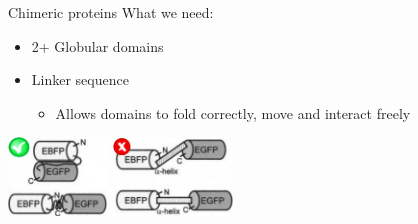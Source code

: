 \documentclass{beamer}
\begin{document}
\begin{frame}{Chimeric proteins}
What we need:
\begin{itemize}
 \item 2+ Globular domains
 \item Linker sequence
 \begin{itemize}
    \pause
    \item Allows domains to fold correctly, move and interact freely
\end{itemize}
\end{itemize}
\vspace{20px}
\pause
\includegraphics[width=100px]{../img/linkerOk-sign.png}
\hspace{40px}
\pause
\includegraphics[width=120px]{../img/linkerBad-sign.png}
\end{frame}
\end{document}
